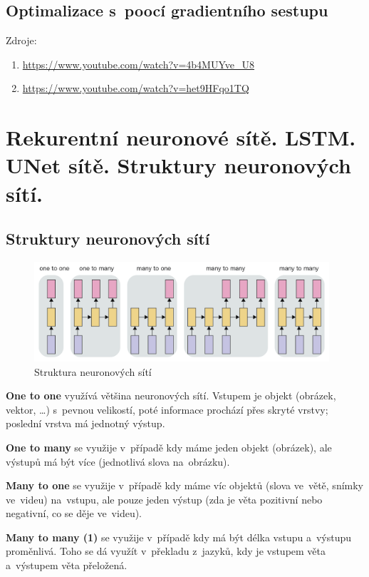 \subsection{Optimalizace s~poocí gradientního sestupu}


Zdroje:
\begin{enumerate}
    \item \url{https://www.youtube.com/watch?v=4b4MUYve_U8}
    \item \url{https://www.youtube.com/watch?v=het9HFqo1TQ}
\end{enumerate}

\clearpage
\section{Rekurentní neuronové sítě. LSTM. UNet sítě. Struktury neuronových sítí.}

\subsection{Struktury neuronových sítí}

\begin{figure}[h]
    \centering
	\includegraphics[height=10em]{images/09_NN-struktura.png}
    \caption{Struktura neuronových sítí}
    \label{NNS}
\end{figure}

\textbf{One to one} využívá většina neuronových sítí. 
Vstupem je objekt (obrázek, vektor, \dots) s~pevnou velikostí, poté informace prochází přes skryté vrstvy; poslední vrstva má jednotný výstup.

\textbf{One to many} se využije v~případě kdy máme jeden objekt (obrázek), ale výstupů má být více (jednotlivá slova na~obrázku).

\textbf{Many to one} se využije v~případě kdy máme víc objektů (slova ve~větě, snímky ve~videu) na~vstupu, ale pouze jeden výstup (zda je věta pozitivní nebo negativní, co se děje ve~videu).

\textbf{Many to many (1)} se využije v~případě kdy má být délka vstupu a~výstupu proměnlivá.
Toho se dá využít v~překladu z~jazyků, kdy je vstupem věta a~výstupem věta přeložená.


